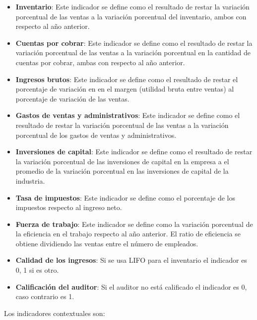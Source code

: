 \begin{itemize}

\item \textbf{Inventario}: Este indicador se define como el resultado de restar la variación porcentual de las ventas a la variación porcentual del inventario, ambos con respecto al año anterior.

\item \textbf{Cuentas por cobrar}: Este indicador se define como el resultado de restar la variación porcentual de las ventas a la variación porcentual en la cantidad de cuentas por cobrar, ambas con respecto al año anterior.

\item \textbf{Ingresos brutos}: Este indicador se define como el resultado de restar el porcentaje de variación en en el margen (utilidad bruta entre ventas) al porcentaje de variación de las ventas.

\item \textbf{Gastos de ventas y administrativos}: Este indicador se define como el resultado de restar la variación porcentual de las ventas a la variación porcentual de los gastos de ventas y administrativos.

\item \textbf{Inversiones de capital}: Este indicador se define como el resultado de restar la variación porcentual de las inversiones de capital en la empresa a el promedio de la variación porcentual en las inversiones de capital de la industria.

\item \textbf{Tasa de impuestos}: Este indicador se define como el porcentaje de los impuestos respecto al ingreso neto.

\item \textbf{Fuerza de trabajo}: Este indicador se define como la variación porcentual de la eficiencia en el trabajo respecto al año anterior. El ratio de eficiencia se obtiene dividiendo las ventas entre el número de empleados.

\item \textbf{Calidad de los ingresos}: Si se usa LIFO para el inventario el indicador es 0, 1 si es otro.

\item \textbf{Calificación del auditor}: Si el auditor no está calificado el indicador es 0, caso contrario es 1.
\end{itemize}


Los indicadores contextuales son:\\

